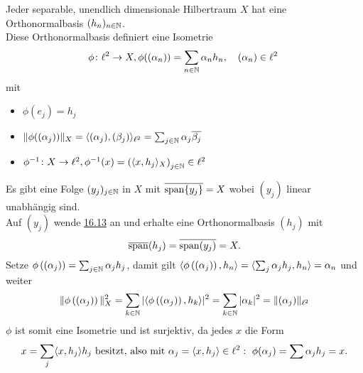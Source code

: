 \begin{satz}
	Jeder separable, unendlich dimensionale Hilbertraum $X$ hat eine Orthonormalbasis $(h_{n})_{n \in \mathbb{N}}	$. \\
	Diese Orthonormalbasis definiert eine Isometrie
		\[ \phi \colon \ell^{2} \rightarrow X, \phi( (\alpha_{n}) ) = \sum_{n \in \MdN} \alpha_{n} h_{n}, \quad (\alpha_{n}) \in \ell^{2} \]
	mit 
	\begin{itemize}
		\item $\phi( e_{j} ) = h_{j}$
		\item $\| \phi( (\alpha_{j}) ) \|_{X} = \langle (\alpha_{j}),(\beta_{j}) \rangle_{\ell^{2}} = \sum_{j \in \mathbb{N}} \alpha_{j} \overline{\beta_{j}}$
		\item $\phi^{-1} \colon X \rightarrow \ell^{2}, \phi^{-1}(x) = \left( \langle x, h_{j} \rangle_{X} \right)_{j \in \mathbb{N}} \in \ell^{2}$
	\end{itemize}
\end{satz}

\begin{beweis}
	Es gibt eine Folge $(y_{j})_{j \in \mathbb{N}}$ in $X$ mit $\overline{\operatorname{span}\{ y_{j} \}} = X$ wobei $(y_{j})$ linear unabhängig sind. \\
	Auf $(y_{j})$ wende \hyperref[satz:13.6-Orthogonalzerlegung]{16.13} an und erhalte eine Orthonormalbasis $(h_{j})$ mit 
		\[ \overline{\operatorname{span}}(h_{j}) = \overline{\operatorname{span}(y_{j})} = X. \]
	Setze $\phi \left( (\alpha_{j}) \right) = \sum_{j \in \mathbb{N}} \alpha_{j} h_{j}$, damit gilt $\langle \phi \left( (\alpha_{j}) \right) , h_{n} \rangle = \langle \sum_{j} \alpha_{j} h_{j}, h_{n} \rangle = \alpha_{n}$ und weiter
	 \[ \| \phi \left( (\alpha_{j}) \right)  \|^{2}_{X} = \sum_{k \in \mathbb{N}} | \langle \phi \left( (\alpha_{j}) \right), h_{k} \rangle |^{2} = \sum_{k \in \mathbb{N}} | \alpha_{k} |^{2} = \| (\alpha_{j}) \|_{\ell^{2}} \]
	$\phi$ ist somit eine Isometrie und ist surjektiv, da jedes $x$ die Form
	\[ x = \sum_{j} \langle x, h_{j} \rangle h_{j} \text{ besitzt, also mit }\alpha_{j} = \langle x, h_{j} \rangle \in \ell^{2}: \text{ } \phi(\alpha_{j} ) = \sum \alpha_{j} h_{j} = x. \]
\end{beweis}



\newpage